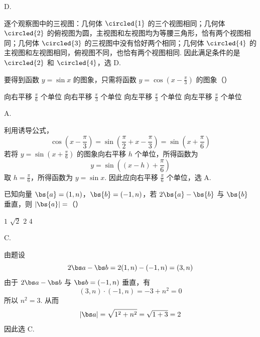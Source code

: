 \begin{answer}
D.
\end{answer}

\begin{solution}
逐个观察图中的三视图：几何体 \(\circled{1}\) 的三个视图相同；几何体 \(\circled{2}\) 的俯视图为圆，主视图和左视图均为等腰三角形，恰有两个视图相同；几何体 \(\circled{3}\) 的三视图中没有恰好两个相同；几何体 \(\circled{4}\) 的主视图和左视图相同，俯视图不同，也恰有两个视图相同. 因此满足条件的是 \(\circled{2}\) 和 \(\circled{4}\)，选 D.
\end{solution}

\begin{problem}
要得到函数 \( y = \sin x \) 的图象，只需将函数 \( y = \cos \left(x - \frac{\pi}{3}\right) \) 的图象（\quad）

\choices
    {向右平移 \(\frac{\pi}{6}\) 个单位}
    {向右平移 \(\frac{\pi}{3}\) 个单位}
    {向左平移 \(\frac{\pi}{3}\) 个单位}
    {向左平移 \(\frac{\pi}{6}\) 个单位}
\end{problem}

\begin{answer}
A.
\end{answer}

\begin{solution}
利用诱导公式，
\[
\cos\left(x-\frac{\pi}{3}\right)
=\sin\left(\frac{\pi}{2}+x-\frac{\pi}{3}\right)
=\sin\left(x+\frac{\pi}{6}\right)
\]
若将 \(y=\sin(x+\frac{\pi}{6})\) 的图象向右平移 \(h\) 个单位，所得函数为
\[
y=\sin\left((x-h)+\frac{\pi}{6}\right)
\]
取 \(h=\frac{\pi}{6}\)，所得函数为 \(y=\sin x\). 因此应向右平移 \(\frac{\pi}{6}\) 个单位，选 A.
\end{solution}

\begin{problem}
已知向量 \(\bs{a} = (1, n)\)，\(\bs{b} = (-1, n)\)，若 \(2\bs{a} - \bs{b}\) 与 \(\bs{b}\) 垂直，则 \(|\bs{a}| =\)（\quad）

\choices
    {\(1\)}
    {\(\sqrt{2}\)}
    {\(2\)}
    {\(4\)}
\end{problem}

\begin{answer}
C.
\end{answer}

\begin{solution}
由题设
\[
2\bs a-\bs b=2(1,n)-(-1,n)=(3,n)
\]
由于 \(2\bs a-\bs b\) 与 \(\bs b=(-1,n)\) 垂直，有
\[
(3,n)\cdot(-1,n)=-3+n^2=0
\]
所以 \(n^2=3\). 从而
\[
|\bs a|=\sqrt{1^2+n^2}=\sqrt{1+3}=2
\]
因此选 C.
\end{solution}

